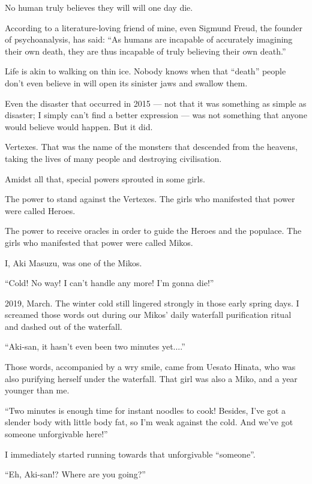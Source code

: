 

No human truly believes they will will one day die.

According to a literature-loving friend of mine, even Sigmund Freud, the founder of psychoanalysis, has said: ``As humans are incapable of accurately imagining their own death, they are thus incapable of truly believing their own death.''

Life is akin to walking on thin ice. Nobody knows when that ``death'' people don't even believe in will open its sinister jaws and swallow them.

Even the disaster that occurred in 2015 --- not that it was something as simple as disaster; I simply can't find a better expression --- was not something that anyone would believe would happen. But it did.

Vertexes. That was the name of the monsters that descended from the heavens, taking the lives of many people and destroying civilisation.

Amidst all that, special powers sprouted in some girls.

The power to stand against the Vertexes. The girls who manifested that power were called Heroes.

The power to receive oracles in order to guide the Heroes and the populace. The girls who manifested that power were called Mikos.

I, Aki Masuzu, was one of the Mikos.

``Cold! No way! I can't handle any more! I'm gonna die!''

2019, March. The winter cold still lingered strongly in those early spring days. I screamed those words out during our Mikos' daily waterfall purification ritual and dashed out of the waterfall.

``Aki-san, it hasn't even been two minutes yet....''

Those words, accompanied by a wry smile, came from Uesato Hinata, who was also purifying herself under the waterfall. That girl was also a Miko, and a year younger than me.

``Two minutes is enough time for instant noodles to cook! Besides, I've got a slender body with little body fat, so I'm weak against the cold. And we've got someone unforgivable here!''

I immediately started running towards that unforgivable ``someone''.

``Eh, Aki-san!? Where are you going?''

